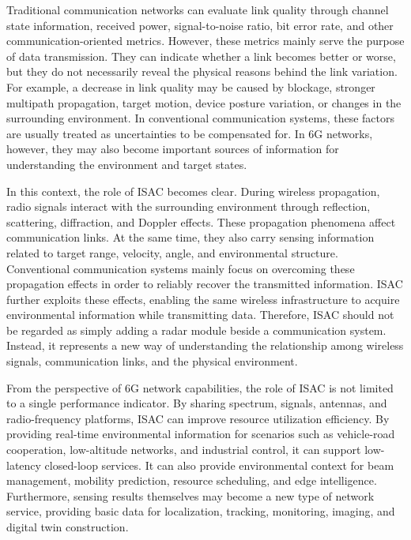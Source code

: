 Traditional communication networks can evaluate link quality through channel state information, received power, signal-to-noise ratio, bit error rate, and other communication-oriented metrics.
However, these metrics mainly serve the purpose of data transmission.
They can indicate whether a link becomes better or worse, but they do not necessarily reveal the physical reasons behind the link variation.
For example, a decrease in link quality may be caused by blockage, stronger multipath propagation, target motion, device posture variation, or changes in the surrounding environment.
In conventional communication systems, these factors are usually treated as uncertainties to be compensated for.
In 6G networks, however, they may also become important sources of information for understanding the environment and target states.

In this context, the role of ISAC becomes clear.
During wireless propagation, radio signals interact with the surrounding environment through reflection, scattering, diffraction, and Doppler effects.
These propagation phenomena affect communication links.
At the same time, they also carry sensing information related to target range, velocity, angle, and environmental structure.
Conventional communication systems mainly focus on overcoming these propagation effects in order to reliably recover the transmitted information.
ISAC further exploits these effects, enabling the same wireless infrastructure to acquire environmental information while transmitting data.
Therefore, ISAC should not be regarded as simply adding a radar module beside a communication system.
Instead, it represents a new way of understanding the relationship among wireless signals, communication links, and the physical environment.

From the perspective of 6G network capabilities, the role of ISAC is not limited to a single performance indicator.
By sharing spectrum, signals, antennas, and radio-frequency platforms, ISAC can improve resource utilization efficiency.
By providing real-time environmental information for scenarios such as vehicle-road cooperation, low-altitude networks, and industrial control, it can support low-latency closed-loop services.
It can also provide environmental context for beam management, mobility prediction, resource scheduling, and edge intelligence.
Furthermore, sensing results themselves may become a new type of network service, providing basic data for localization, tracking, monitoring, imaging, and digital twin construction.

